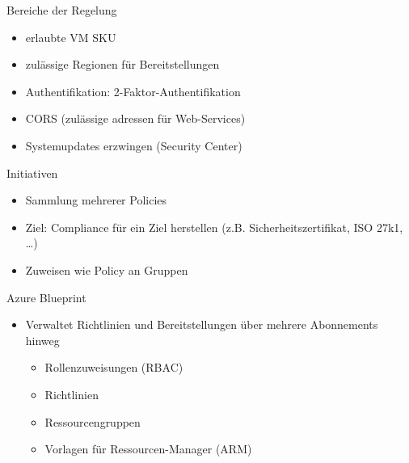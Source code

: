 \begin{flashcard}[Definition]{Bereiche der Regelung}
  \begin{itemize}
    \item erlaubte VM SKU
    \item zulässige Regionen für Bereitstellungen
    \item Authentifikation: 2-Faktor-Authentifikation
    \item CORS (zulässige adressen für Web-Services)
    \item Systemupdates erzwingen (Security Center)
  \end{itemize}
\end{flashcard}

\begin{flashcard}[Definition]{Initiativen}
  \begin{itemize}
    \item Sammlung mehrerer Policies
    \item Ziel: Compliance für ein Ziel herstellen (z.B. Sicherheitszertifikat, ISO 27k1, \ldots)
    \item Zuweisen wie Policy an Gruppen
  \end{itemize}
\end{flashcard}


\begin{flashcard}[Definition]{Azure Blueprint}
  \begin{itemize}
    \item Verwaltet Richtlinien und Bereitstellungen über mehrere Abonnements hinweg
    \begin{itemize}
      \item Rollenzuweisungen (RBAC)
      \item Richtlinien
      \item Ressourcengruppen
      \item Vorlagen für Ressourcen-Manager (ARM)
    \end{itemize}
  \end{itemize}
\end{flashcard}

